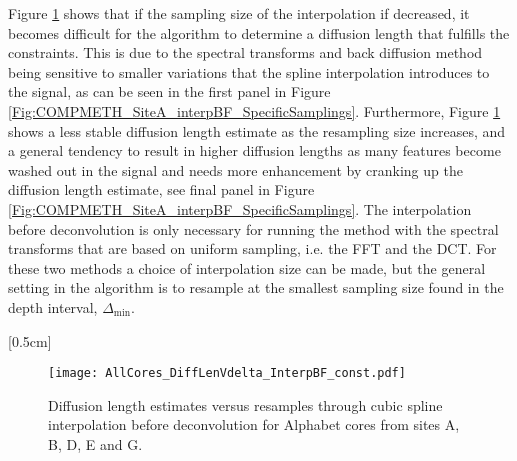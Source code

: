 \documentclass[../../CompleteThesis2/Complete_2ndDraft]{subfiles}
\begin{document}
Figure \ref{Fig:COMPMETH_SamplingVsDiffLen_interpBF} shows that if the sampling size of the interpolation if decreased, it becomes difficult for the algorithm to determine a diffusion length that fulfills the constraints. This is due to the spectral transforms and back diffusion method being sensitive to smaller variations that the spline interpolation introduces to the signal, as can be seen in the first panel in Figure \ref{Fig:COMPMETH_SiteA_interpBF_SpecificSamplings}. Furthermore, Figure \ref{Fig:COMPMETH_SamplingVsDiffLen_interpBF} shows a less stable diffusion length estimate as the resampling size increases, and a general tendency to result in higher diffusion lengths as many features become washed out in the signal and needs more enhancement by cranking up the diffusion length estimate, see final panel in Figure \ref{Fig:COMPMETH_SiteA_interpBF_SpecificSamplings}. The interpolation before deconvolution is only necessary for running the method with the spectral transforms that are based on uniform sampling, i.e. the FFT and the DCT. For these two methods a choice of interpolation size can be made, but the general setting in the algorithm is to resample at the smallest sampling size found in the depth interval, $\Delta_{\text{min}}$.

[0.5cm]%
\begin{figure}[!htb]
	\centering
	\texttt{[image: AllCores\_DiffLenVdelta\_InterpBF\_const.pdf]}
	\caption[Diffusion length versus resampling size before deconvolution, all cores.]{\small Diffusion length estimates versus resamples through cubic spline interpolation before deconvolution for Alphabet cores from sites A, B, D, E and G.}
	\label{Fig:COMPMETH_SamplingVsDiffLen_interpBF}
\end{figure}
\end{document}
